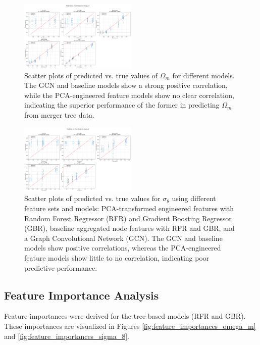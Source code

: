 \documentclass[twocolumn]{aastex631}
\begin{document}
\begin{figure}[h!]
    \centering
    \includegraphics[width=0.5\textwidth]{../input_files/plots/predicted_vs_true_Omega_m_9_20250527-135752.png}
    \caption{Scatter plots of predicted vs. true values of $\Omega_m$ for different models. The GCN and baseline models show a strong positive correlation, while the PCA-engineered feature models show no clear correlation, indicating the superior performance of the former in predicting $\Omega_m$ from merger tree data.}
    \label{fig:predicted_vs_true_omega_m}
\end{figure}

\begin{figure}[h!]
    \centering
    \includegraphics[width=0.5\textwidth]{../input_files/plots/predicted_vs_true_sigma_8_10_20250527-135752.png}
    \caption{Scatter plots of predicted vs. true values for $\sigma_8$ using different feature sets and models: PCA-transformed engineered features with Random Forest Regressor (RFR) and Gradient Boosting Regressor (GBR), baseline aggregated node features with RFR and GBR, and a Graph Convolutional Network (GCN). The GCN and baseline models show positive correlations, whereas the PCA-engineered feature models show little to no correlation, indicating poor predictive performance.}
    \label{fig:predicted_vs_true_sigma_8}
\end{figure}

\subsection{Feature Importance Analysis}

Feature importances were derived for the tree-based models (RFR and GBR). These importances are visualized in Figures \ref{fig:feature_importances_omega_m} and \ref{fig:feature_importances_sigma_8}.
\end{document}
